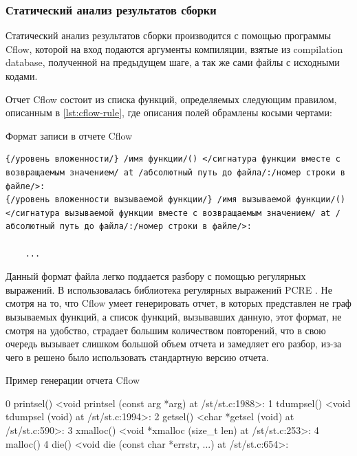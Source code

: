 \subsubsection{Статический анализ результатов сборки}\label{sec:ch2/sec2/sub3/sub2}
Статический анализ результатов сборки производится с помощью программы Cflow, которой на вход
подаются аргументы компиляции, взятые из compilation database, полученной на предыдущем шаге,
а так же сами файлы с исходными кодами.

Отчет Cflow состоит из списка функций, определяемых следующим правилом, описанным в \autoref{lst:cflow-rule},
где описания полей обрамлены косыми чертами:

\begin{ListingEnv}[!h]
    \captiondelim{ }
    \caption{Формат записи в отчете Cflow}\label{lst:cflow-rule}
    \begin{lstlisting}[]
{/уровень вложенности/} /имя функции/() </сигнатура функции вместе с возвращаемым значением/ at /абсолютный путь до файла/:/номер строки в файле/>:
{/уровень вложенности вызываемой функции/} /имя вызываемой функции/() </сигнатура вызываемой функции вместе с возвращаемым значением/ at /абсолютный путь до файла/:/номер строки в файле/>:

    ... 
    \end{lstlisting}
\end{ListingEnv}

Данный формат файла легко поддается разбору с помощью регулярных выражений. В {\ProgModule} использовалась
библиотека регулярных выражений PCRE \autocite{pcre}.
Не смотря на то, что Cflow умеет генерировать отчет, в которых представлен не граф вызываемых функций,
а список функций, вызывавших данную, этот формат, не смотря на удобство, страдает большим количеством
повторений, что в свою очередь вызывает слишком большой объем отчета и замедляет его разбор, из-за
чего в {\ProgModule} решено было использовать стандартную версию отчета.

\begin{ListingEnv}[!h]
    \captiondelim{ }
    \caption{Пример генерации отчета Cflow}\label{lst:cflow-example}
    \begin{Verb}[]
{   0} printsel() <void printsel (const arg *arg) at /st/st.c:1988>:
{   1}  tdumpsel() <void tdumpsel (void) at /st/st.c:1994>:
{   2}    getsel() <char *getsel (void) at /st/st.c:590>:
{   3}      xmalloc() <void *xmalloc (size_t len) at /st/st.c:253>:
{   4}        malloc()
{   4}        die() <void die (const char *errstr, ...) at /st/st.c:654>:
    \end{Verb}
\end{ListingEnv}

